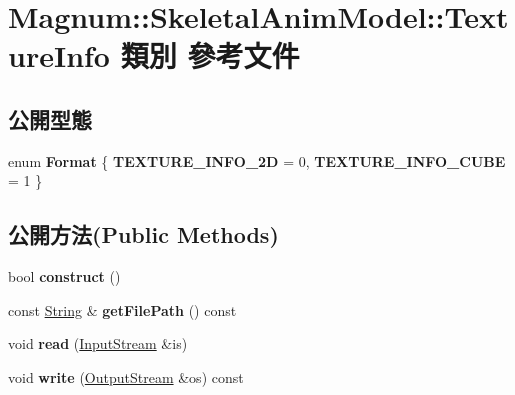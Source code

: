 \hypertarget{class_magnum_1_1_skeletal_anim_model_1_1_texture_info}{}\section{Magnum\+:\+:Skeletal\+Anim\+Model\+:\+:Texture\+Info 類別 參考文件}
\label{class_magnum_1_1_skeletal_anim_model_1_1_texture_info}
\subsection*{公開型態}
\begin{DoxyCompactItemize}
\item 
enum {\bfseries Format} \{ {\bfseries T\+E\+X\+T\+U\+R\+E\+\_\+\+I\+N\+F\+O\+\_\+2D} = 0, 
{\bfseries T\+E\+X\+T\+U\+R\+E\+\_\+\+I\+N\+F\+O\+\_\+\+C\+U\+BE} = 1
 \}\hypertarget{class_magnum_1_1_skeletal_anim_model_1_1_texture_info_a85c42af550f2d11a60a96a955b9c957a}{}\label{class_magnum_1_1_skeletal_anim_model_1_1_texture_info_a85c42af550f2d11a60a96a955b9c957a}

\end{DoxyCompactItemize}
\subsection*{公開方法(Public Methods)}
\begin{DoxyCompactItemize}
\item 
bool {\bfseries construct} ()\hypertarget{class_magnum_1_1_skeletal_anim_model_1_1_texture_info_aec8773d5dce3912661f4a792e320df3e}{}\label{class_magnum_1_1_skeletal_anim_model_1_1_texture_info_aec8773d5dce3912661f4a792e320df3e}

\item 
const \hyperlink{class_magnum_1_1_string}{String} \& {\bfseries get\+File\+Path} () const \hypertarget{class_magnum_1_1_skeletal_anim_model_1_1_texture_info_aef93b39be91bc33a32e9403567d462af}{}\label{class_magnum_1_1_skeletal_anim_model_1_1_texture_info_aef93b39be91bc33a32e9403567d462af}

\item 
void {\bfseries read} (\hyperlink{class_magnum_1_1_input_stream}{Input\+Stream} \&is)\hypertarget{class_magnum_1_1_skeletal_anim_model_1_1_texture_info_a731e3e446b1ed606ac626ed197d92fa1}{}\label{class_magnum_1_1_skeletal_anim_model_1_1_texture_info_a731e3e446b1ed606ac626ed197d92fa1}

\item 
void {\bfseries write} (\hyperlink{class_magnum_1_1_output_stream}{Output\+Stream} \&os) const \hypertarget{class_magnum_1_1_skeletal_anim_model_1_1_texture_info_ab2772f7a0b1fc8eac40198b7a979d681}{}\label{class_magnum_1_1_skeletal_anim_model_1_1_texture_info_ab2772f7a0b1fc8eac40198b7a979d681}

\end{DoxyCompactItemize}
